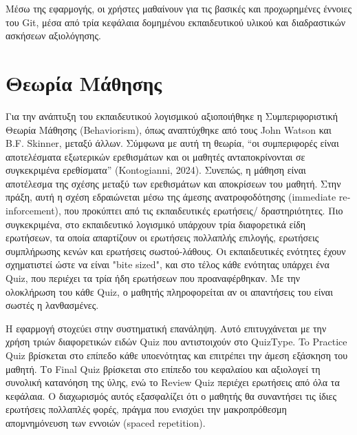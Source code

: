 \documentclass{article}
\begin{document}
Μέσω της εφαρμογής, οι χρήστες μαθαίνουν για τις βασικές και προχωρημένες έννοιες του \foreignlanguage{english}{Git}, μέσα από τρία κεφάλαια δομημένου εκπαιδευτικού υλικού και διαδραστικών ασκήσεων αξιολόγησης.

\newpage

\section{Θεωρία Μάθησης}
Για την ανάπτυξη του εκπαιδευτικού λογισμικού αξιοποιήθηκε η Συμπεριφοριστική Θεωρία Μάθησης \foreignlanguage{english}{(Behaviorism)}, όπως αναπτύχθηκε από τους \foreignlanguage{english}{John Watson} και \foreignlanguage{english}{B.F. Skinner}, μεταξύ άλλων. Σύμφωνα με αυτή τη θεωρία, “οι συμπεριφορές είναι αποτελέσματα εξωτερικών ερεθισμάτων και οι μαθητές ανταποκρίνονται σε συγκεκριμένα ερεθίσματα” (\foreignlanguage{english}{Kontogianni, 2024)}. Συνεπώς, η μάθηση είναι αποτέλεσμα της σχέσης μεταξύ των ερεθισμάτων και αποκρίσεων του μαθητή. Στην πράξη, αυτή η σχέση εδραιώνεται μέσω της άμεσης ανατροφοδότησης (\foreignlanguage{english}{immediate reinforcement)}, που προκύπτει από τις εκπαιδευτικές ερωτήσεις/ δραστηριότητες. Πιο συγκεκριμένα, στο εκπαιδευτικό λογισμικό υπάρχουν τρία διαφορετικά είδη ερωτήσεων, τα οποία απαρτίζουν οι ερωτήσεις πολλαπλής επιλογής, ερωτήσεις συμπλήρωσης κενών και ερωτήσεις σωστού-λάθους. Οι εκπαιδευτικές ενότητες έχουν σχηματιστεί ώστε να είναι \foreignlanguage{english}{"bite sized"}, και στο τέλος κάθε ενότητας υπάρχει ένα \foreignlanguage{english}{Quiz}, που περιέχει τα τρία ήδη ερωτήσεων που προαναφέρθηκαν. Με την ολοκλήρωση του κάθε \foreignlanguage{english}{Quiz}, ο μαθητής πληροφορείται αν οι απαντήσεις του είναι σωστές η λανθασμένες.

Η εφαρμογή στοχεύει στην συστηματική επανάληψη. Αυτό επιτυγχάνεται με την χρήση τριών διαφορετικών ειδών \foreignlanguage{english}{Quiz} που αντιστοιχούν στο \foreignlanguage{english}{QuizType}. To \foreignlanguage{english}{Practice Quiz} βρίσκεται στο επίπεδο κάθε υποενότητας και επιτρέπει την άμεση εξάσκηση του μαθητή. Το \foreignlanguage{english}{Final Quiz} βρίσκεται στο επίπεδο του κεφαλαίου και αξιολογεί τη συνολική κατανόηση της ύλης, ενώ το \foreignlanguage{english}{Review Quiz} περιέχει ερωτήσεις από όλα τα κεφάλαια. Ο διαχωρισμός αυτός εξασφαλίζει ότι ο μαθητής θα συναντήσει τις ίδιες ερωτήσεις πολλαπλές φορές, πράγμα που ενισχύει την μακροπρόθεσμη απομνημόνευση των εννοιών (\foreignlanguage{english}{spaced repetition)}.
\end{document}
